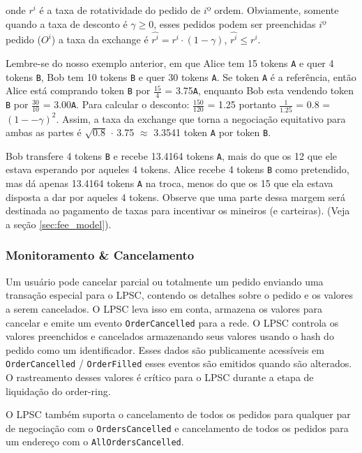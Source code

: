 \documentclass[UTF8,nofonts]{article}
\begin{document}
\begin{multicols}{2}
onde $r^i$ é a taxa de rotatividade do pedido de $i$º ordem. Obviamente, somente quando a taxa de desconto é $\gamma \ge 0$, esses pedidos podem ser preenchidas $i$º pedido ($O^i$) a taxa da exchange é $\hat{r^i} = r^i \cdot (1-\gamma)$, $\hat{r^i}\le r^i$.

Lembre-se do nosso exemplo anterior, em que Alice tem 15 tokens \verb|A| e quer 4 tokens \verb|B|, Bob tem 10 tokens \verb|B| e quer 30 tokens \verb|A|. Se token \verb|A| é a referência, então Alice está comprando token \verb|B| por $\frac{15}{4}$ = 3.75\verb|A|, enquanto Bob esta vendendo token \verb|B| por $\frac{30}{10}$ = 3.00\verb|A|. Para calcular o desconto: $\frac{150}{120}$ = 1.25 portanto $\frac{1}{1.25}$ = 0.8 = $(1 −- \gamma)^2$. Assim, a taxa da exchange que torna a negociação equitativo para ambas as partes é $\sqrt{0.8}$ $\cdot$ 3.75 $\approx$ 3.3541 token \verb|A| por token \verb|B|.

Bob transfere 4 tokens \verb|B| e recebe 13.4164 tokens \verb|A|, mais do que os 12 que ele estava esperando por aqueles 4 tokens. Alice recebe 4 tokens \verb|B| como pretendido, mas dá apenas 13.4164 tokens \verb|A| na troca, menos do que os 15 que ela estava disposta a dar por aqueles 4 tokens.
Observe que uma parte dessa margem será destinada ao pagamento de taxas para incentivar os mineiros (e carteiras). (Veja a seção \ref{sec:fee_model}).


\subsubsection{Monitoramento \& Cancelamento}

Um usuário pode cancelar parcial ou totalmente um pedido enviando uma transação especial para o LPSC, contendo os detalhes sobre o pedido e os valores a serem cancelados. O LPSC leva isso em conta, armazena os valores para cancelar e emite um evento \verb|OrderCancelled| para a rede. O LPSC controla os valores preenchidos e cancelados armazenando seus valores usando o hash do pedido como um identificador. Esses dados são publicamente acessíveis em \verb|OrderCancelled| / \verb|OrderFilled| esses eventos são emitidos quando são alterados. O rastreamento desses valores é crítico para o LPSC durante a etapa de liquidação do order-ring.

O LPSC também suporta o cancelamento de todos os pedidos para qualquer par de negociação com o \verb|OrdersCancelled| e cancelamento de todos os pedidos para um endereço com o \verb|AllOrdersCancelled|.



\end{multicols}
\end{document}
